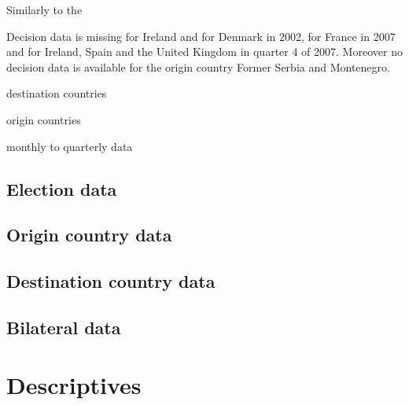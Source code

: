 \documentclass[11pt,a4paper]{scrartcl}
\begin{document}
Similarly to the 

Decision data is missing for Ireland and for Denmark in 2002, for France in 2007 and for Ireland, Spain and the United Kingdom in quarter 4 of 2007. Moreover no decision data is available for the origin country Former Serbia and Montenegro.   






destination countries

origin countries

monthly to quarterly data


\subsection{Election data}
\subsection{Origin country data}
\subsection{Destination country data}
\subsection{Bilateral data}


\clearpage
\FloatBarrier
\section{Descriptives}


 

 
 

 

\clearpage
\FloatBarrier
\end{document}
